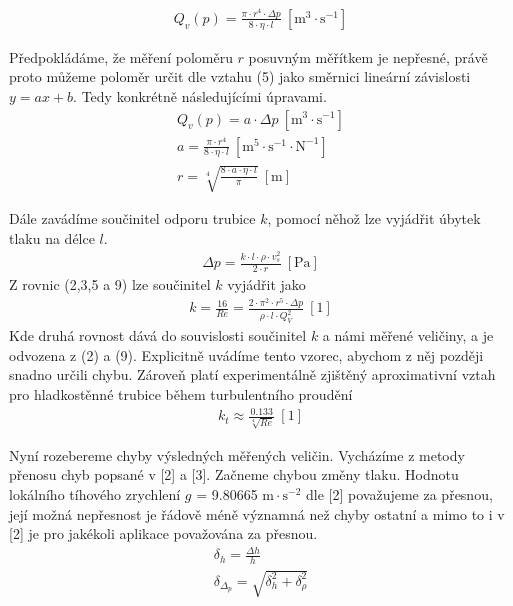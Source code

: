 \documentclass[a4paper]{article}
\begin{document}
\begin{align}
Q_{v}(p) = \frac{\pi \cdot r^{4} \cdot \Delta p}{8 \cdot \eta \cdot l}  \: \mathrm{[m^{3} \cdot s^{-1}]}
\end{align}
\par Předpokládáme, že měření poloměru $r$ posuvným měřítkem je nepřesné, právě proto můžeme poloměr určit dle vztahu (5) jako směrnici lineární závislosti $y = ax + b$. Tedy konkrétně následujícími úpravami.
\begin{align}
Q_{v}(p) = a \cdot \Delta p  \: \mathrm{[m^{3} \cdot s^{-1}]} \\
a = \frac{\pi \cdot r^{4}}{8 \cdot \eta \cdot l} \: \mathrm{[m^{5} \cdot s^{-1} \cdot N^{-1} ]} \\
r = \sqrt[4]{\frac{8 \cdot a \cdot \eta \cdot l}{\pi}}  \: \mathrm{[m]}
\end{align}
\par Dále zavádíme součinitel odporu trubice $k$, pomocí něhož lze vyjádřit úbytek tlaku na délce $l$.
\begin{align}
\Delta p = \frac{k \cdot l \cdot \rho \cdot v^{2}_{s}}{2 \cdot r}   \: \mathrm{[Pa]}
\end{align}
Z rovnic (2,3,5 a 9) lze součinitel $k$ vyjádřit jako
\begin{align}
k = \frac{16}{Re} =  \frac{2 \cdot \pi^{2} \cdot r^{5} \cdot \Delta p}{\rho \cdot l \cdot Q^{2}_{V}}  \: \mathrm{[1]}
\end{align}
Kde druhá rovnost dává do souvislosti součinitel $k$ a námi měřené veličiny, a je odvozena z (2) a (9). Explicitně uvádíme tento vzorec, abychom z něj později snadno určili chybu. Zároveň platí experimentálně zjištěný aproximativní vztah pro hladkostěnné trubice během turbulentního proudění
\begin{align}
k_{t} \approx \frac{0.133}{\sqrt[4]{Re}} \: \mathrm{[1]}
\end{align}
\par Nyní rozebereme chyby výsledných měřených veličin. Vycházíme z metody přenosu chyb popsané v [2] a [3]. Začneme chybou změny tlaku. Hodnotu lokálního tíhového zrychlení $g$ = 9.80665 $\mathrm{m \cdot s^{-2}}$ dle [2] považujeme za přesnou, její možná nepřesnost je řádově méně významná než chyby ostatní a mimo to i v [2] je pro jakékoli aplikace považována za přesnou.
\begin{align}
\delta_{h} = \frac{\Delta h}{h} \\
\delta_{\Delta_p} = \sqrt{\delta^{2}_{h} + \delta^{2}_{\rho}}
\end{align}
\end{document}
